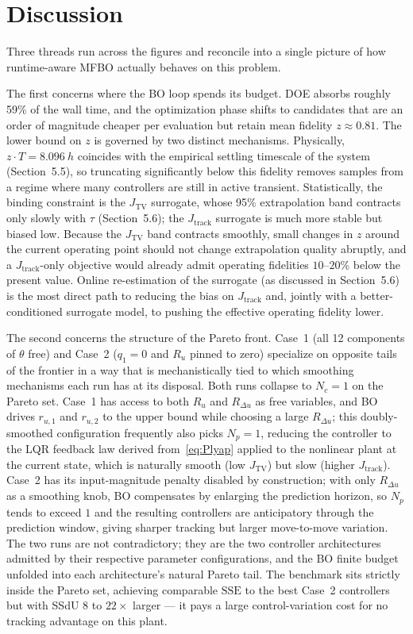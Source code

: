 \documentclass[11pt,a4paper]{article}
\newcommand{\jtrack}{J_{\mathrm{track}}}
\newcommand{\jtv}{J_{\mathrm{TV}}}
\newcommand{\sse}{\mathrm{SSE}}
\newcommand{\Nc}{N_c}
\newcommand{\Np}{N_p}
\begin{document}
\section{Discussion}
\label{sec:discussion}

Three threads run across the figures and reconcile into a single picture of how runtime-aware MFBO actually behaves on this problem.

The first concerns where the BO loop spends its budget. DOE absorbs roughly 59\% of the wall time, and the optimization phase shifts to candidates that are an order of magnitude cheaper per evaluation but retain mean fidelity $z \approx 0.81$. The lower bound on $z$ is governed by two distinct mechanisms. Physically, $z \cdot T = \SI{8.096}{h}$ coincides with the empirical settling timescale of the system (Section~5.5), so truncating significantly below this fidelity removes samples from a regime where many controllers are still in active transient. Statistically, the binding constraint is the $\jtv$ surrogate, whose 95\% extrapolation band contracts only slowly with $\tau$ (Section~5.6); the $\jtrack$ surrogate is much more stable but biased low. Because the $\jtv$ band contracts smoothly, small changes in $z$ around the current operating point should not change extrapolation quality abruptly, and a $\jtrack$-only objective would already admit operating fidelities $10$--$20\%$ below the present value. Online re-estimation of the surrogate (as discussed in Section~5.6) is the most direct path to reducing the bias on $\jtrack$ and, jointly with a better-conditioned surrogate model, to pushing the effective operating fidelity lower.

The second concerns the structure of the Pareto front. Case~1 (all 12 components of $\theta$ free) and Case~2 ($q_1 = 0$ and $R_u$ pinned to zero) specialize on opposite tails of the frontier in a way that is mechanistically tied to which smoothing mechanisms each run has at its disposal. Both runs collapse to $\Nc = 1$ on the Pareto set. Case~1 has access to both $R_u$ and $R_{\Delta u}$ as free variables, and BO drives $r_{u,1}$ and $r_{u,2}$ to the upper bound while choosing a large $R_{\Delta u}$; this doubly-smoothed configuration frequently also picks $\Np = 1$, reducing the controller to the LQR feedback law derived from~\eqref{eq:Plyap} applied to the nonlinear plant at the current state, which is naturally smooth (low $\jtv$) but slow (higher $\jtrack$). Case~2 has its input-magnitude penalty disabled by construction; with only $R_{\Delta u}$ as a smoothing knob, BO compensates by enlarging the prediction horizon, so $\Np$ tends to exceed $1$ and the resulting controllers are anticipatory through the prediction window, giving sharper tracking but larger move-to-move variation. The two runs are not contradictory; they are the two controller architectures admitted by their respective parameter configurations, and the BO finite budget unfolded into each architecture's natural Pareto tail. The benchmark sits strictly inside the Pareto set, achieving comparable $\sse$ to the best Case~2 controllers but with SSdU $8$ to $22\times$ larger --- it pays a large control-variation cost for no tracking advantage on this plant.
\end{document}
